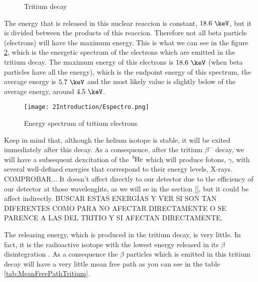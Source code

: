 \begin{figure}[hbtp]
 \centering
 \caption{Tritium decay}
 \label{fig:TritiumDecay}
\end{figure}

The energy that is released in this nuclear reaccion is constant, $18.6~\keV$, but it is divided between the products of this reaccion. Therefore not all beta particle (electrons) will have the maximum energy. This is what we can see in the figure \ref{fig:TritiumDecaySpectrum}, which is the energetic spectrum of the electrons which are emitted in the tritium decay. The maximum energy of this electrons is $18.6~\keV$ (when beta particles have all the energy), which is the endpoint energy of this spectrum, the average energy is $5.7~\keV$ and the most likely value is slightly below of the average energy, around $4.5~\keV$.

\begin{figure}[hbtp]
\texttt{[image: 2Introduction/Espectro.png]}
\centering
\caption{Energy spectrum of tritium electrons ~\cite{TesisTritio}\label{fig:TritiumDecaySpectrum}}
\end{figure}

Keep in mind that, although the helium isotope is stable, it will be exited immediately after this decay. As a consequence, after the tritium $\beta^-$ decay, we will have a subsequent dexcitation of the $\ce{^{3}He}$ which will produce fotons, $\gamma$, with several well-defined energies that correspond to their energy levels, X-rays. COMPROBAR... It doesn't affect directly to our detector due to the efficiency of our detector at those wavelenghts, as we will se in the section \ref{},  but it could be affect indirectly. BUSCAR ESTAS ENERGÍAS Y VER SI SON TAN DIFERENTES COMO PARA NO AFECTAR DIRECTAMENTE O SE PARENCE A LAS DEL TRITIO Y SI AFECTAN DIRECTAMENTE.

The releasing energy, which is produced in the tritium decay, is very little. In fact, it is the radioactive isotope with the lowest energy released in its $\beta$ disintegration \cite{TritiumHandling}. As a consequence the $\beta$ particles which is emitted in this tritium decay will have a very little mean free path as you can see in the table \ref{tab:MeanFreePathTritium}.

